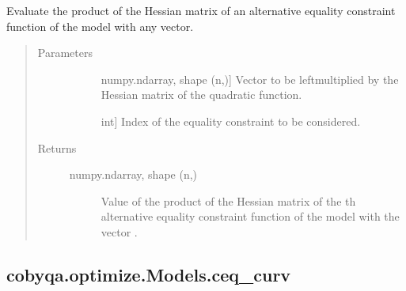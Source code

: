\documentclass[letterpaper,10pt,english]{sphinxmanual}
\begin{document}
\begin{fulllineitems}
\begin{fulllineitems}
\label{\detokenize{refs/generated/cobyqa.optimize.Models.ceq_alt_hessp:cobyqa.optimize.Models.ceq_alt_hessp}}
\sphinxAtStartPar
Evaluate the product of the Hessian matrix of an alternative equality
constraint function of the model with any vector.
\begin{quote}\begin{description}
\item[{Parameters}] \leavevmode\begin{description}
\item[{}] \leavevmode{[}numpy.ndarray, shape (n,){]}
\sphinxAtStartPar
Vector to be left\sphinxhyphen{}multiplied by the Hessian matrix of the quadratic
function.

\item[{}] \leavevmode{[}int{]}
\sphinxAtStartPar
Index of the equality constraint to be considered.

\end{description}

\item[{Returns}] \leavevmode\begin{description}
\item[{numpy.ndarray, shape (n,)}] \leavevmode
\sphinxAtStartPar
Value of the product of the Hessian matrix of the \sphinxhyphen{}th alternative
equality constraint function of the model with the vector .

\end{description}

\end{description}\end{quote}

\end{fulllineitems}



\subsection{cobyqa.optimize.Models.ceq\_curv}
\label{\detokenize{refs/generated/cobyqa.optimize.Models.ceq_curv:cobyqa-optimize-models-ceq-curv}}\label{\detokenize{refs/generated/cobyqa.optimize.Models.ceq_curv::doc}}


\end{fulllineitems}
\end{document}
